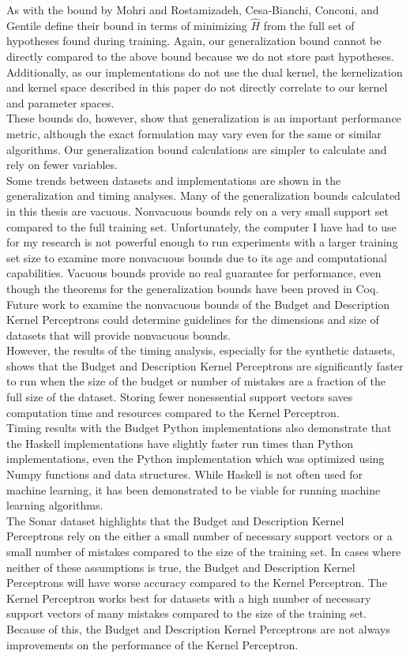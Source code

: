 As with the bound by Mohri and Rostamizadeh, Cesa-Bianchi, Conconi, and Gentile define their bound in terms of minimizing $\hat{H}$ from the full set of hypotheses found during training. Again, our generalization bound cannot be directly compared to the above bound because we do not store past hypotheses. Additionally, as our implementations do not use the dual kernel, the kernelization and kernel space described in this paper do not directly correlate to our kernel and parameter spaces.
\\These bounds do, however, show that generalization is an important performance metric, although the exact formulation may vary even for the same or similar algorithms. Our generalization bound calculations are simpler to calculate and rely on fewer variables. 
\\Some trends between datasets and implementations are shown in the generalization and timing analyses. Many of the generalization bounds calculated in this thesis are vacuous. Nonvacuous bounds rely on a very small support set compared to the full training set. Unfortunately, the computer I have had to use for my research is not powerful enough to run experiments with a larger training set size to examine more nonvacuous bounds due to its age and computational capabilities. Vacuous bounds provide no real guarantee for performance, even though the theorems for the generalization bounds have been proved in Coq. Future work to examine the nonvacuous bounds of the Budget and Description Kernel Perceptrons could determine guidelines for the dimensions and size of datasets that will provide nonvacuous bounds.
\\However, the results of the timing analysis, especially for the synthetic datasets, shows that the Budget and Description Kernel Perceptrons are significantly faster to run when the size of the budget or number of mistakes are a fraction of the full size of the dataset. Storing fewer nonessential support vectors saves computation time and resources compared to the Kernel Perceptron.
\\Timing results with the Budget Python implementations also demonstrate that the Haskell implementations have slightly faster run times than Python implementations, even the Python implementation which was optimized using Numpy functions and data structures. While Haskell is not often used for machine learning, it has been demonstrated to be viable for running machine learning algorithms. 
\\The Sonar dataset highlights that the Budget and Description Kernel Perceptrons rely on the either a small number of necessary support vectors or a small number of mistakes compared to the size of the training set. In cases where neither of these assumptions is true, the Budget and Description Kernel Perceptrons will have worse accuracy compared to the Kernel Perceptron. The Kernel Perceptron works best for datasets with a high number of necessary support vectors of many mistakes compared to the size of the training set. Because of this, the Budget and Description Kernel Perceptrons are not always improvements on the performance of the Kernel Perceptron.
